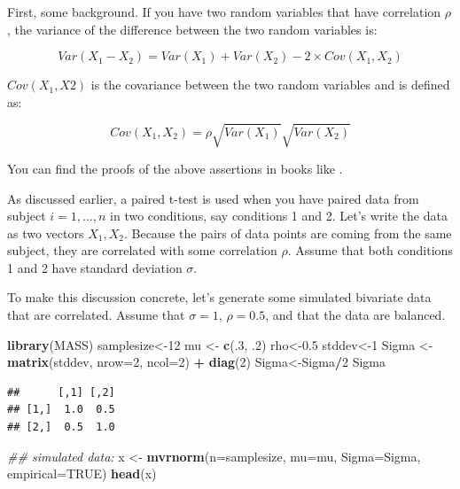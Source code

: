 \documentclass[12pt,]{krantz}
\newenvironment{Shaded}{\begin{snugshade}}{\end{snugshade}}
\newcommand{\CommentTok}[1]{\textcolor[rgb]{0.56,0.35,0.01}{\textit{#1}}}
\newcommand{\DataTypeTok}[1]{\textcolor[rgb]{0.13,0.29,0.53}{#1}}
\newcommand{\DecValTok}[1]{\textcolor[rgb]{0.00,0.00,0.81}{#1}}
\newcommand{\FloatTok}[1]{\textcolor[rgb]{0.00,0.00,0.81}{#1}}
\newcommand{\KeywordTok}[1]{\textcolor[rgb]{0.13,0.29,0.53}{\textbf{#1}}}
\newcommand{\NormalTok}[1]{#1}
\newcommand{\OperatorTok}[1]{\textcolor[rgb]{0.81,0.36,0.00}{\textbf{#1}}}
\newcommand{\OtherTok}[1]{\textcolor[rgb]{0.56,0.35,0.01}{#1}}
\newcommand{\StringTok}[1]{\textcolor[rgb]{0.31,0.60,0.02}{#1}}
\begin{document}
First, some background. If you have two random variables that have correlation \(\rho\), the variance of the difference between the two random variables is:

\begin{equation}
Var(X_1-X_2)=Var(X_1) + Var(X_2) - 2\times Cov(X_1, X_2)
\end{equation}

\(Cov(X_1, X2)\) is the covariance between the two random variables and is defined as:

\begin{equation}
Cov(X_1, X_2) = \rho \sqrt{Var(X_1)}\sqrt{Var(X_2)}
\end{equation}

You can find the proofs of the above assertions in books like \citet{rice1995mathematical}.

As discussed earlier, a paired t-test is used when you have paired data from subject \(i=1,...,n\) in two conditions, say conditions 1 and 2. Let's write the data as two vectors \(X_{1}, X_{2}\). Because the pairs of data points are coming from the same subject, they are correlated with some correlation \(\rho\). Assume that both conditions 1 and 2 have standard deviation \(\sigma\).

To make this discussion concrete, let's generate some simulated bivariate data that are correlated. Assume that \(\sigma = 1\),
\(\rho=0.5\), and that the data are balanced.

\begin{Shaded}
\begin{Highlighting}[]
\KeywordTok{library}\NormalTok{(MASS)}
\NormalTok{samplesize<-}\DecValTok{12}
\NormalTok{mu <-}\StringTok{ }\KeywordTok{c}\NormalTok{(.}\DecValTok{3}\NormalTok{, }\FloatTok{.2}\NormalTok{)}
\NormalTok{rho<-}\FloatTok{0.5}
\NormalTok{stddev<-}\DecValTok{1}
\NormalTok{Sigma <-}\StringTok{ }\KeywordTok{matrix}\NormalTok{(stddev, }\DataTypeTok{nrow=}\DecValTok{2}\NormalTok{, }\DataTypeTok{ncol=}\DecValTok{2}\NormalTok{) }\OperatorTok{+}\StringTok{ }\KeywordTok{diag}\NormalTok{(}\DecValTok{2}\NormalTok{)}
\NormalTok{Sigma<-Sigma}\OperatorTok{/}\DecValTok{2}
\NormalTok{Sigma}
\end{Highlighting}
\end{Shaded}

\begin{verbatim}
##      [,1] [,2]
## [1,]  1.0  0.5
## [2,]  0.5  1.0
\end{verbatim}

\begin{Shaded}
\begin{Highlighting}[]
\CommentTok{## simulated data:}
\NormalTok{x <-}\StringTok{ }\KeywordTok{mvrnorm}\NormalTok{(}\DataTypeTok{n=}\NormalTok{samplesize, }\DataTypeTok{mu=}\NormalTok{mu, }\DataTypeTok{Sigma=}\NormalTok{Sigma, }\DataTypeTok{empirical=}\OtherTok{TRUE}\NormalTok{)}
\KeywordTok{head}\NormalTok{(x)}
\end{Highlighting}
\end{Shaded}
\end{document}
